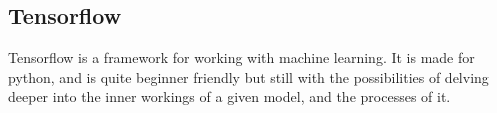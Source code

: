 \subsection{Tensorflow}
Tensorflow is a framework for working with machine learning.
It is made for python, and is quite beginner friendly but still with the possibilities of delving deeper into the inner workings of a given model, and the processes of it.



